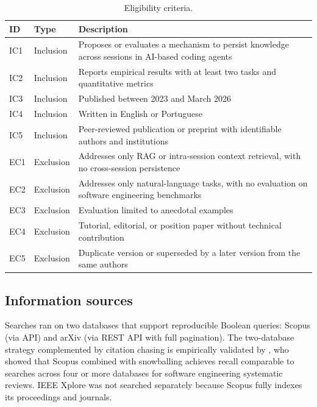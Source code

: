 \begin{table}[htbp]
  \centering
  \caption{Eligibility criteria.}
  \label{tab:criterios}
  \begin{tabularx}{\textwidth}{l l X}
    \toprule
    ID  & Type & Description \\
    \midrule
    IC1 & Inclusion & Proposes or evaluates a mechanism to persist
      knowledge across sessions in AI-based coding agents \\
    IC2 & Inclusion & Reports empirical results with at least two
      tasks and quantitative metrics \\
    IC3 & Inclusion & Published between 2023 and March 2026 \\
    IC4 & Inclusion & Written in English or Portuguese \\
    IC5 & Inclusion & Peer-reviewed publication or preprint with
      identifiable authors and institutions \\
    \midrule
    EC1 & Exclusion & Addresses only RAG or intra-session context
      retrieval, with no cross-session persistence \\
    EC2 & Exclusion & Addresses only natural-language tasks, with no
      evaluation on software engineering benchmarks \\
    EC3 & Exclusion & Evaluation limited to anecdotal examples \\
    EC4 & Exclusion & Tutorial, editorial, or position paper without
      technical contribution \\
    EC5 & Exclusion & Duplicate version or superseded by a later
      version from the same authors \\
    \bottomrule
  \end{tabularx}
\end{table}

\subsection{Information sources}
\label{sec:fontes}

Searches ran on two databases that support reproducible Boolean queries:
Scopus (via API) and arXiv (via REST API with full pagination).
The two-database strategy complemented by citation chasing is empirically
validated by \citet{mourao2020hybrid}, who showed that Scopus combined
with snowballing achieves recall comparable to searches across four or
more databases for software engineering systematic reviews.
IEEE Xplore was not searched separately because Scopus fully indexes its
proceedings and journals.

